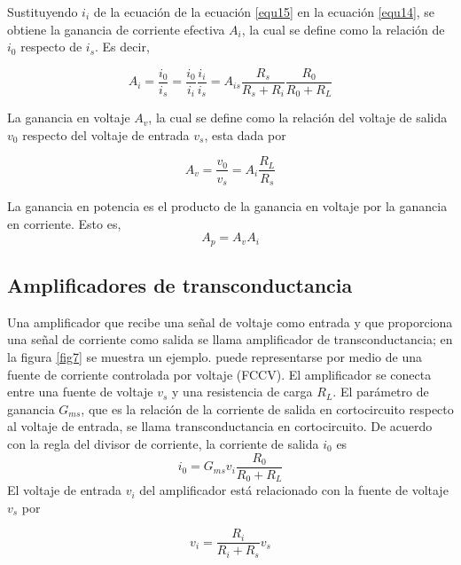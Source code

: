 \documentclass[12pt]{book}
\theoremstyle{definition}
\theoremstyle{remark}
\theoremstyle{plain}
\begin{document}
Sustituyendo $i_i$ de la ecuación de la ecuación \ref{equ15} en la ecuación \ref{equ14}, se obtiene la ganancia de corriente efectiva $A_i$, la cual se define como la relación de $i_0$ respecto de $i_s$. Es decir,

\begin{equation}
\label{equ16}
A_i = \frac{i_0}{i_s} = \frac{i_0}{i_i} \frac{i_i}{i_s}= A_{i s} \frac{R_s}{R_s+R_i} \frac{R_0}{R_0+R_L}
\end{equation}

La ganancia en voltaje $A_v$, la cual se define como la relación del voltaje de salida $v_0$ respecto del voltaje de entrada $v_s$, esta dada por

\begin{equation}
\label{equ17}
A_v = \frac{v_0}{v_s}=A_i \frac{R_L}{R_s}
\end{equation}

La ganancia en potencia es el producto de la ganancia en voltaje por la ganancia en corriente. Esto es,
\begin{equation}
\label{equ18}
A_p = A_v A_i
\end{equation}

\subsection{Amplificadores de transconductancia}

Una amplificador que recibe una señal de voltaje como entrada y que proporciona una señal de corriente como salida se llama amplificador de transconductancia; en la figura \ref{fig7} se muestra un ejemplo. puede representarse por medio de una fuente de corriente controlada por voltaje (FCCV). El amplificador se conecta entre una fuente de voltaje $v_s$ y una resistencia de carga $R_L$. El parámetro de ganancia $G_{m s}$, que es la relación de la corriente de salida en cortocircuito respecto al voltaje de entrada, se llama transconductancia en cortocircuito. De acuerdo con la regla del divisor de corriente, la corriente de salida $i_0$ es
\begin{equation}
\label{equ19}
i_0 = G_{m s} v_i \frac{R_0}{R_0+R_L}
\end{equation}
El voltaje de entrada $v_i$ del amplificador está relacionado con la fuente de voltaje $v_s$ por

\begin{equation}
\label{equ20}
v_i = \frac{R_i}{R_i+R_s} v_s
\end{equation}
\end{document}
